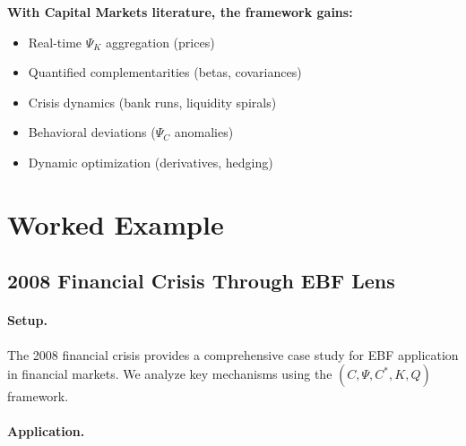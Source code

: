 \textbf{With Capital Markets literature, the framework gains:}
\begin{itemize}
    \item Real-time $\Psi_K$ aggregation (prices)
    \item Quantified complementarities (betas, covariances)
    \item Crisis dynamics (bank runs, liquidity spirals)
    \item Behavioral deviations ($\Psi_C$ anomalies)
    \item Dynamic optimization (derivatives, hedging)
\end{itemize}


\section{Worked Example}
\label{sec:Y-example}

\subsection{2008 Financial Crisis Through EBF Lens}

\paragraph{Setup.}
The 2008 financial crisis provides a comprehensive case study for EBF
application in financial markets. We analyze key mechanisms using the
$(C, \Psi, C^*, K, Q)$ framework.

\paragraph{Application.}


